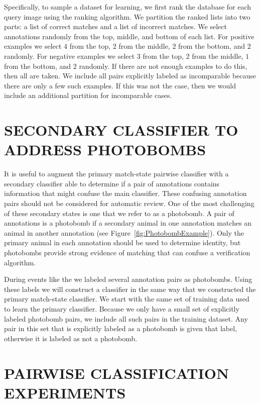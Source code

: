     Specifically, to sample a dataset for learning, we first rank the database for each query image using the
      ranking algorithm.
    We partition the ranked lists into two parts:
    a list of correct matches and a list of incorrect matches.
    We select annotations randomly from the top, middle, and bottom of each list.
    For positive examples we select $4$ from the top, $2$ from the middle, $2$ from the bottom, and $2$ randomly.
    For negative examples we select $3$ from the top, $2$ from the middle, $1$ from the bottom, and $2$ randomly.
    If there are not enough examples to do this, then all are taken.
    We include all pairs explicitly labeled as incomparable because there are only a few such examples.
    If this was not the case, then we would include an additional partition for incomparable cases.


\section{SECONDARY CLASSIFIER TO ADDRESS PHOTOBOMBS}\label{sec:learnpb}
    It is useful to augment the primary match-state pairwise classifier with a secondary classifier able to
      determine if a pair of annotations contains information that might confuse the main classifier.
    These confusing annotation pairs should not be considered for automatic review.
    One of the most challenging of these secondary states is one that we refer to as a {photobomb}.
    A pair of annotations is a photobomb if a secondary animal in one annotation matches an animal in another
      annotation (\eg see Figure~\ref{fig:PhotobombExample}).
    Only the primary animal in each annotation should be used to determine identity, but photobombs provide
      strong evidence of matching that can confuse a verification algorithm.

    \PhotobombExample{}

    During events like the \GZC{} we labeled several annotation pairs as photobombs.
    Using these labels we will construct a classifier in the same way that we constructed the primary match-state
      classifier.
    We start with the same set of training data used to learn the primary classifier.
    Because we only have a small set of explicitly labeled photobomb pairs, we include all such pairs in the
      training dataset.
    Any pair in this set that is explicitly labeled as a photobomb is given that label, otherwise it is labeled
      as not a photobomb.

\section{PAIRWISE CLASSIFICATION EXPERIMENTS}\label{sec:pairexpt}


